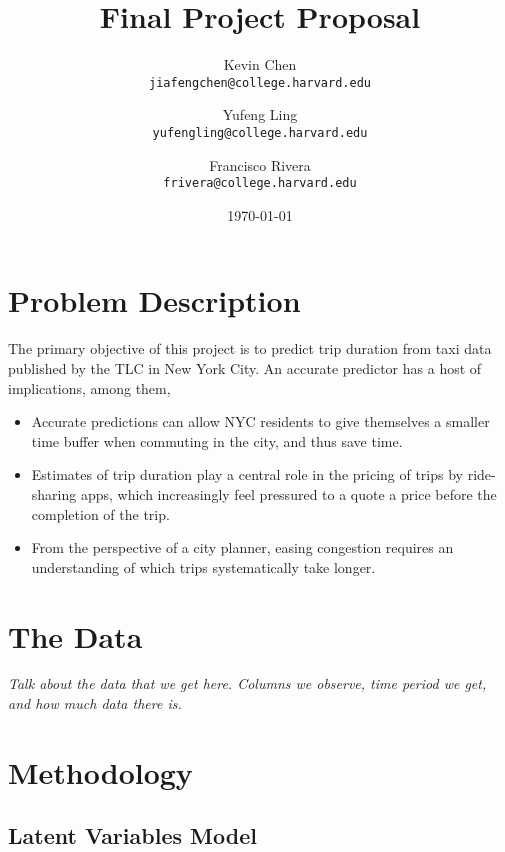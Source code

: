 \documentclass[10pt]{article}
\begin{document}
\title{Final Project Proposal}
\author{
Kevin Chen              \\ \texttt{jiafengchen@college.harvard.edu}
\and Yufeng Ling        \\ \texttt{yufengling@college.harvard.edu}
\and Francisco Rivera   \\ \texttt{frivera@college.harvard.edu}}
\date{\today}

\maketitle

\section{Problem Description}

The primary objective of this project is to predict trip duration from taxi data
published by the TLC in New York City. An accurate predictor has a host of
implications, among them,

\begin{itemize}
\item Accurate predictions can allow NYC residents to give themselves a smaller
time buffer when commuting in the city, and thus save time.

\item Estimates of trip duration play a central role in the pricing of trips by
ride-sharing apps, which increasingly feel pressured to a quote a price before
the completion of the trip.

\item From the perspective of a city planner, easing congestion requires an
understanding of which trips systematically take longer.
\end{itemize}

\section{The Data}

\emph{Talk about the data that we get here. Columns we observe, time period we
get, and how much data there is.}


\section{Methodology}

\subsection{Latent Variables Model}

\begin{center}
\end{center}
\end{document}
